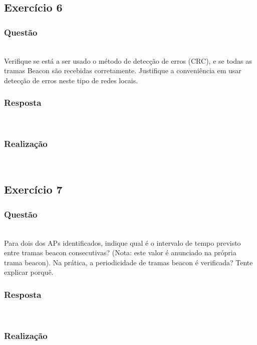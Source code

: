 \documentclass{llncs}
\begin{document}
\clearpage
\subsection{Exercício 6}
\subsubsection{Questão}\rule[-10pt]{0pt}{10pt}\\

Verifique se está a ser usado o método de detecção de erros (CRC), e se todas as tramas Beacon são recebidas corretamente. Justifique a conveniência em usar detecção de erros neste tipo de redes locais.

\subsubsection{Resposta}\rule[-10pt]{0pt}{10pt}\\



\subsubsection{Realização}\rule[-10pt]{0pt}{10pt}\\



\clearpage
\subsection{Exercício 7}
\subsubsection{Questão}\rule[-10pt]{0pt}{10pt}\\

Para dois dos APs identificados, indique qual é o intervalo de tempo previsto entre tramas beacon consecutivas? (Nota: este valor é anunciado na própria trama beacon). Na prática, a periodicidade de tramas beacon é verificada? Tente explicar porquê.

\subsubsection{Resposta}\rule[-10pt]{0pt}{10pt}\\



\subsubsection{Realização}\rule[-10pt]{0pt}{10pt}\\
\end{document}
